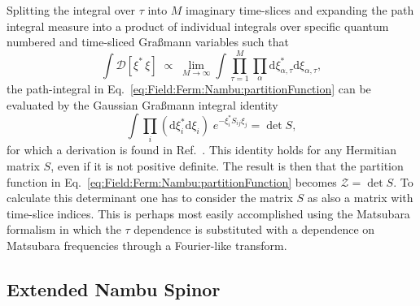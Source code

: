 Splitting the integral over $\tau$ into $M$ imaginary time-slices and expanding the path integral measure into a product of individual integrals
over specific quantum numbered and time-sliced Gra\ss mann variables such that 
\begin{equation}
    \label{eq:Field:Ferm:Nambu:fieldMeasure}
    \int\!\mathcal{D}[\xi^\ast\,\xi] \;\propto\; \lim_{M\rightarrow\infty}\int\prod_{\tau=1}^M\prod_\alpha\mathrm{d}\xi^\ast_{\alpha,\tau}\mathrm{d}\xi_{\alpha,\tau},
\end{equation}
the path-integral in Eq.~\eqref{eq:Field:Ferm:Nambu:partitionFunction}
can be evaluated by the Gaussian Gra\ss mann integral identity
\begin{equation}
    \label{eq:Field:Ferm:Nambu:quadraticGrassmannInt}
    \int\prod_i(\mathrm{d}\xi_i^\ast\mathrm{d}\xi_i)\;e^{-\xi_i^\ast S_{ij}\xi_j} = \det S,
\end{equation}
for which a derivation is found in Ref.~\cite{NegeleOrland98}. This identity holds for any Hermitian matrix $S$, even if it is not positive definite.
The result is then that the partition function in Eq.~\eqref{eq:Field:Ferm:Nambu:partitionFunction}
becomes $\mathcal{Z} = \det S$. To calculate this determinant one has to consider the matrix $S$ as also a matrix with
time-slice indices. This is perhaps most easily accomplished using the Matsubara formalism in which the $\tau$ dependence is substituted with a dependence on Matsubara
frequencies through a Fourier-like transform.

\subsection{Extended Nambu Spinor}

